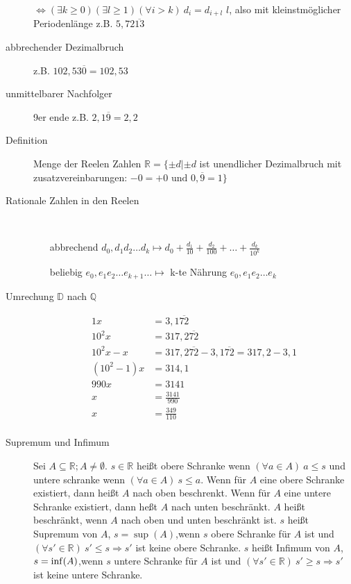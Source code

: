 \begin{description}
    $\Leftrightarrow (\exists k \geq 0)(\exists l \geq 1) (\forall i > k)\ d_i= d_{i + l}$ $l$, also mit kleinstmöglicher Periodenlänge z.B. $5{,}72\overline{13}$
    \item[abbrechender Dezimalbruch] z.B. $102{,}53\overline{0} = 102{,}53$
    \item[unmittelbarer Nachfolger] 9er ende z.B. $2{,}1\overline{9} = 2{,}2$
    \item[Definition] Menge der Reelen Zahlen $\mathbb{R} = \lbrace \pm d | \pm d $ ist unendlicher Dezimalbruch mit zusatzvereinbarungen: $ -0 = +0 \textrm{ und } 0{,}\overline{9} = 1 \rbrace$
    \item[Rationale Zahlen in den Reelen] \
    \begin{itemize}
        \item[abbrechend] $d_0{,}d_1 d_2 \dots d_k \longmapsto d_0 + \frac{d_1}{10}+\frac{d_2}{100} + \dots + \frac{d_k}{10^k}$
        \item[beliebig] $e_0{,}e_1 e_2 \dots e_{k + 1} \dots \longmapsto$ k-te Nährung $e_0{,}e_1 e_2 \dots e_k$
    \end{itemize}
    \item[Umrechung $\mathbb{D}$ nach $\mathbb{Q}$]
    \begin{alignat*}{1}
        x         & = 3{,}1\overline{72}                                          \\
        10^2x     & = 317{,}2\overline{72}                                        \\
        10^2x-x   & = 317{,}2\overline{72} - 3{,}1\overline{72} = 317{,}2 - 3{,}1 \\
        (10^2-1)x & = 314{,}1                                                     \\
        990x      & = 3141                                                        \\
        x         & = \frac{3141}{990}                                            \\
        x         & = \frac{349}{110}                                             \\
    \end{alignat*}
    \item[Supremum und Infimum] Sei $A \subseteq \mathbb{R}; A \not = \emptyset$. $s \in \mathbb{R}$ heißt obere Schranke wenn $(\forall a \in A)\ a \leq s$ und untere schranke wenn $(\forall a \in A)\ s \leq a$. Wenn für $A$ eine obere Schranke existiert, dann heißt $A$ nach oben beschrenkt. Wenn für $A$ eine untere Schranke existiert, dann heßt $A$ nach unten beschränkt. $A$ heißt beschränkt, wenn $A$ nach oben und unten beschränkt ist. $s$ heißt Supremum von $A$, $s = \sup(A)$,wenn $s$ obere Schranke für $A$ ist und $(\forall s' \in \mathbb{R})\ s' \leq s \Rightarrow s'$ ist keine obere Schranke. $s$ heißt Infimum von $A$, $s = \operatorname{inf}(A)$,wenn $s$ untere Schranke für $A$ ist und $(\forall s' \in \mathbb{R})\ s' \geq s \Rightarrow s'$ ist keine untere Schranke.


\end{description}
